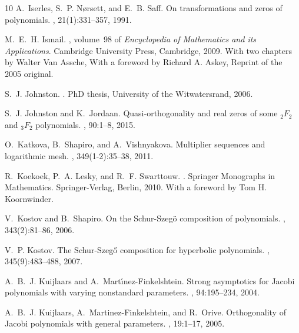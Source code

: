 \documentclass[reqno,11pt]{amsart}
\theoremstyle{remark}
\begin{document}
\begin{thebibliography}{10}
	A.~Iserles, S.~P. N{\o}rsett, and E.~B. Saff.
	\newblock On transformations and zeros of polynomials.
	, 21(1):331--357, 1991.
	
	M.~E.~H. Ismail.
	,
	volume~98 of {\em Encyclopedia of Mathematics and its Applications}.
	\newblock Cambridge University Press, Cambridge, 2009.
	\newblock With two chapters by Walter Van Assche, With a foreword by Richard A.
	Askey, Reprint of the 2005 original.
	
	S.~J. Johnston.
	.
	\newblock PhD thesis, University of the Witwatersrand, 2006.
	
	S.~J. Johnston and K.~Jordaan.
	\newblock Quasi-orthogonality and real zeros of some {$_2F_2$} and {$_3F_2$} polynomials.
	, 90:1--8, 2015.
	
	O.~Katkova, B.~Shapiro, and A.~Vishnyakova.
	\newblock Multiplier sequences and logarithmic mesh.
	, 349(1-2):35--38, 2011.
	
	R.~Koekoek, P.~A. Lesky, and R.~F. Swarttouw.
	.
	\newblock Springer Monographs in Mathematics. Springer-Verlag, Berlin, 2010.
	\newblock With a foreword by Tom H. Koornwinder.
	
	V.~Kostov and B.~Shapiro.
	\newblock On the {S}chur-{S}zeg{\"o} composition of polynomials.
	, 343(2):81--86, 2006.
	
	V.~P. Kostov.
	\newblock The {S}chur-{S}zeg{\H{o}} composition for hyperbolic polynomials.
	, 345(9):483--488, 2007.
	
	A.~B.~J. Kuijlaars and A.~Mart\'{\i}nez-Finkelshtein.
	\newblock Strong asymptotics for {J}acobi polynomials with varying nonstandard parameters.
	, 94:195--234, 2004.
	
	A.~B.~J. Kuijlaars, A.~Martinez-Finkelshtein, and R.~Orive.
	\newblock Orthogonality of {J}acobi polynomials with general parameters.
	, 19:1--17, 2005.
	

\end{thebibliography}
\end{document}
